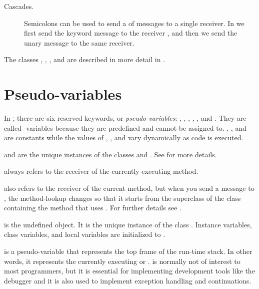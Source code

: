\documentclass[a4paper,10pt,twoside]{book}
\begin{document}
\begin{description}
\item[Cascades.]
	Semicolons can be used to send a  of messages to a single receiver.
	In  we first send the keyword message  to the receiver , and then we send the unary message  to the same receiver.

\end{description}

The classes , , , and  are described in more detail in .


\section{Pseudo-variables}

In \st, there are six reserved keywords, or \emph{pseudo-variables}:
, , , , , and .
They are called -variables because they are predefined and cannot be assigned to.
, , and  are constants while the values of , , and  vary dynamically as code is executed.

 and  are the unique instances of the  classes  and .
See  for more details.

 always refers to the receiver of the currently executing method.

 also refers to the receiver of the current method, but when you send a message to \super, the method-lookup changes so that it starts from the superclass of the class containing the method that uses .
For further details see .

 is the undefined object.
It is the unique instance of the class . 
Instance variables, class variables, and local variables are initialized to .

 is a pseudo-variable that represents the top frame of the run-time stack.
In other words, it represents the currently executing  or .
 is normally not of interest to most programmers, but it is essential for implementing development tools like the debugger and it is also used to implement exception handling and continuations.
\end{document}
